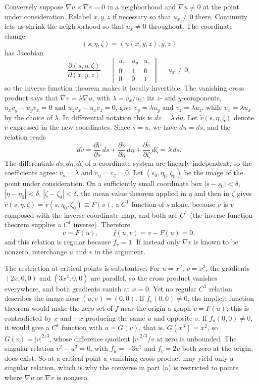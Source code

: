 Conversely suppose $\nabla u\times\nabla v=0$ in a neighborhood and
$\nabla u\ne0$ at the point under consideration. Relabel $x,y,z$ if
necessary so that $u_x\ne0$ there. Continuity lets us shrink the
neighborhood so that $u_x\ne0$ throughout. The coordinate change
\[
(s,\eta,\zeta)=(u(x,y,z),y,z)
\]
has Jacobian
\[
\frac{\partial(s,\eta,\zeta)}{\partial(x,y,z)}
=\begin{vmatrix}u_x&u_y&u_z\\0&1&0\\0&0&1\end{vmatrix}=u_x\ne0,
\]
so the inverse function theorem makes it locally invertible. The
vanishing cross product says that $\nabla v=\lambda\nabla u$, with
$\lambda=v_x/u_x$: its $z$- and $y$-components,
$u_xv_y-u_yv_x=0$ and $u_zv_x-u_xv_z=0$, give $v_y=\lambda u_y$ and
$v_z=\lambda u_z$, while $v_x=\lambda u_x$ by the choice of $\lambda$.
In differential notation this is $dv=\lambda\,du$. Let
$\widetilde v(s,\eta,\zeta)$ denote $v$ expressed in the new
coordinates. Since $s=u$, we have $du=ds$, and the relation reads
\[
d\widetilde v
=\frac{\partial\widetilde v}{\partial s}\,ds
 +\frac{\partial\widetilde v}{\partial\eta}\,d\eta
 +\frac{\partial\widetilde v}{\partial\zeta}\,d\zeta
=\lambda\,ds.
\]
The differentials $ds,d\eta,d\zeta$ of a coordinate system are linearly
independent, so the coefficients agree: $\widetilde v_s=\lambda$ and
$\widetilde v_\eta=\widetilde v_\zeta=0$. Let $(s_0,\eta_0,\zeta_0)$ be
the image of the point under consideration. On a sufficiently small
coordinate box $|s-s_0|<\delta$, $|\eta-\eta_0|<\delta$,
$|\zeta-\zeta_0|<\delta$, the mean value theorem applied in $\eta$ and
then in $\zeta$ gives
$\widetilde v(s,\eta,\zeta)=\widetilde v(s,\eta_0,\zeta_0)\equiv F(s)$,
a $C^1$ function of $s$ alone, because $\widetilde v$ is $v$ composed
with the inverse coordinate map, and both are $C^1$ (the inverse
function theorem supplies a $C^1$ inverse). Therefore
\[
v=F(u),\qquad f(u,v)=v-F(u)=0,
\]
and this relation is regular because $f_v=1$. If instead only
$\nabla v$ is known to be nonzero, interchange $u$ and $v$ in the
argument.

The restriction at critical points is substantive. For $u=x^2$,
$v=x^3$, the gradients $(2x,0,0)$ and $(3x^2,0,0)$ are parallel, so the
cross product vanishes everywhere, and both gradients vanish at $x=0$.
Yet no regular $C^1$ relation describes the image near
$(u,v)=(0,0)$. If $f_v(0,0)\ne0$, the implicit function theorem would
make the zero set of $f$ near the origin a graph $v=F(u)$; this is
contradicted by $x$ and $-x$ producing the same $u$ and opposite $v$.
If $f_u(0,0)\ne0$, it would give a $C^1$ function with $u=G(v)$, that
is, $G(x^3)=x^2$, so $G(v)=|v|^{2/3}$, whose difference quotient
$|v|^{2/3}/v$ at zero is unbounded. The singular relation
$v^2-u^3=0$, with $f_u=-3u^2$ and $f_v=2v$ both zero at the origin,
does exist. So at a critical point a vanishing cross product may yield
only a singular relation, which is why the converse in part (a) is
restricted to points where $\nabla u$ or $\nabla v$ is nonzero.

